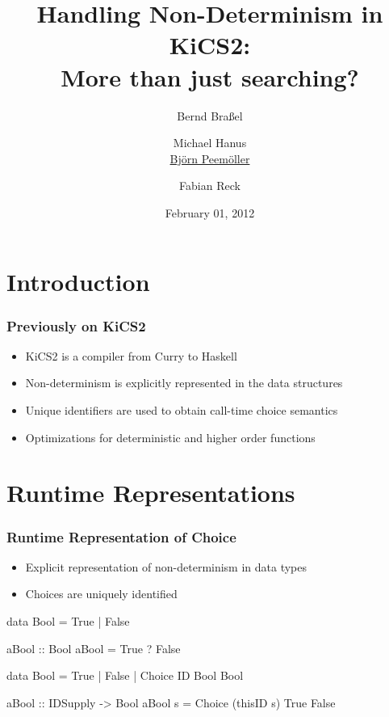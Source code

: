 \documentclass[%
,hyperref={pdfpagelabels=false}
,utf8
]{beamer}
\begin{document}
\title[Handling Non-Determinism in KiCS2]
{Handling Non-Determinism in KiCS2: \\ More than just searching?}

\date{February 01, 2012}

\author[B. Braßel, M. Hanus, \underline{B. Peemöller}, F. Reck]
 {Bernd Braßel \and Michael Hanus \\
   \underline{Björn Peemöller} \and Fabian Reck}


\begin{frame}%
\titlepage
\end{frame}


\section{Introduction}

\begin{frame}[fragile]
\frametitle{Previously on KiCS2}
\begin{itemize}
\item KiCS2 is a compiler from Curry to Haskell
\item Non-determinism is explicitly represented in
      the data structures
\item Unique identifiers are used to obtain
      call-time choice semantics
\item Optimizations for deterministic and higher order functions
\end{itemize}
\end{frame}


\section{Runtime Representations}

\begin{frame}[fragile]%
\frametitle{Runtime Representation of Choice}
\begin{itemize}
  \item Explicit representation of non-determinism in data types
  \item Choices are uniquely identified
\end{itemize}
\pause

\begin{curry}
data Bool = True | False

aBool :: Bool
aBool = True ? False
\end{curry}

\begin{haskell}
data Bool = True | False | Choice ID Bool Bool

aBool :: IDSupply -> Bool
aBool s = Choice (thisID s) True False
\end{haskell}
\end{frame}
\end{document}
